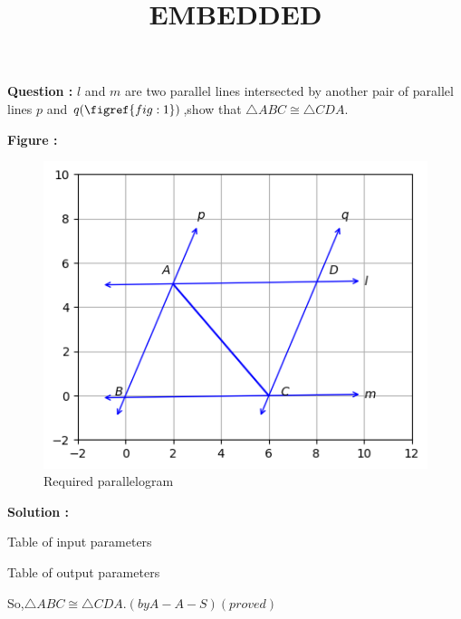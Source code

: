 \documentclass[12pt]{article}
\providecommand{\brak}[1]{\ensuremath{\left(#1\right)}}
\begin{document}
\title{\textbf{EMBEDDED}}
\date{}
\maketitle
\textbf{Question :} $l$ and $m$ are two parallel lines intersected by another pair of parallel lines $p$ and $q (\figref{fig:1})$,show that $\triangle ABC \cong \triangle CDA$.

\textbf{Figure :}
\begin{figure}[H]
    \centering
    \includegraphics{fig/em1.png}
    \caption{Required parallelogram}
    \label{fig:fig:1}
\end{figure}

\textbf{Solution :}
\begin{table}[H]
    \centering
    
    \caption{Table of input parameters}
    \label{tab:tab:1}
\end{table}

\begin{table}[H]
    \centering
    
    \caption{Table of output parameters}
    \label{tab:tab:2}
\end{table}  
So,$\triangle ABC \cong \triangle CDA.\brak{by A-A-S}\brak{proved}$
\end{document}
